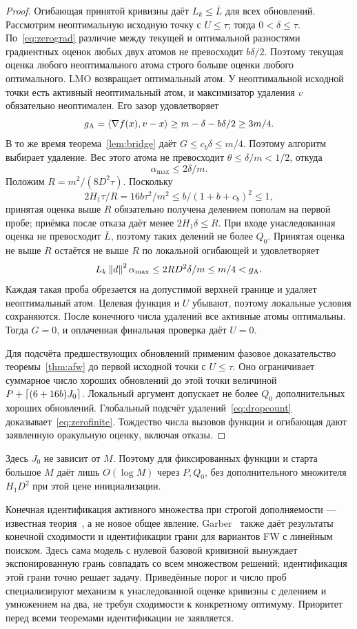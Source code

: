 \begin{proof}
Огибающая принятой кривизны даёт $L_k\le\overline L$ для всех
обновлений. Рассмотрим неоптимальную исходную точку с $U\le\tau$;
тогда $0<\delta\le\tau$. По~\eqref{eq:zerograd} различие между
текущей и оптимальной разностями градиентных оценок любых двух атомов
не превосходит $b\delta/2$. Поэтому текущая оценка любого
неоптимального атома строго больше оценки любого оптимального.
LMO возвращает оптимальный атом. У неоптимальной исходной точки
есть активный неоптимальный атом, и максимизатор удаления $v$
обязательно неоптимален. Его зазор удовлетворяет
\[
 g_{\mathrm A}=\left\langle\nabla f(x),v-x\right\rangle
 \ge m-\delta-b\delta/2\ge3m/4.
\]
В то же время теорема~\ref{lem:bridge} даёт
$G\le c_b\delta\le m/4$. Поэтому алгоритм выбирает удаление.
Вес этого атома не превосходит $\theta\le\delta/m<1/2$, откуда
\[
 \alpha_{\max}\le2\delta/m.
\]
Положим $R=m^2/(8D^2\tau)$. Поскольку
\[
 2H_1\tau/R=16b\tau^2/m^2
 \le b/(1+b+c_b)^2\le1,
\]
принятая оценка выше $R$ обязательно получена делением пополам на
первой пробе; приёмка после отказа даёт менее
$2H_1\delta\le R$. При входе унаследованная оценка не превосходит
$\overline L$, поэтому таких делений не более $Q_0$.
Принятая оценка не выше $R$ остаётся не выше $R$ по локальной
огибающей и удовлетворяет
\[
 L_k\left\|d\right\|^2\alpha_{\max}
 \le 2RD^2\delta/m\le m/4<g_{\mathrm A}.
\]
Каждая такая проба обрезается на допустимой верхней границе и удаляет
неоптимальный атом. Целевая функция и $U$ убывают, поэтому локальные
условия сохраняются. После конечного числа удалений все активные
атомы оптимальны. Тогда $G=0$, и оплаченная финальная проверка даёт
$U=0$.

Для подсчёта предшествующих обновлений применим фазовое доказательство
теоремы~\ref{thm:afw} до первой исходной точки с $U\le\tau$.
Оно ограничивает суммарное число хороших обновлений до этой точки
величиной $P+\left\lceil(6+16b)J_0\right\rceil$. Локальный аргумент допускает
не более $Q_0$ дополнительных хороших обновлений. Глобальный подсчёт
удалений~\eqref{eq:dropcount} доказывает~\eqref{eq:zerofinite}.
Тождество числа вызовов функции и огибающая дают заявленную
оракульную оценку, включая отказы.
\end{proof}
Здесь $J_0$ не зависит от $M$. Поэтому для фиксированных функции
и старта большое $M$ даёт лишь $O(\log M)$ через $P,Q_0$, без
дополнительного множителя $H_1D^2$ при этой цене инициализации.

Конечная идентификация активного множества при строгой
дополняемости — известная теория~\cite[теорема 3.1 и приложение]{bomze},
а не новое общее явление. Garber~\cite[теоремы 4--5]{garber} также
даёт результаты конечной сходимости и идентификации грани для
вариантов FW с линейным поиском. Здесь сама модель с нулевой базовой
кривизной вынуждает экспонированную грань совпадать со всем множеством
решений; идентификация этой грани точно решает задачу. Приведённые
порог и число проб специализируют механизм к унаследованной оценке
кривизны с делением и умножением на два, не требуя сходимости к
конкретному оптимуму. Приоритет перед всеми теоремами идентификации
не заявляется.

